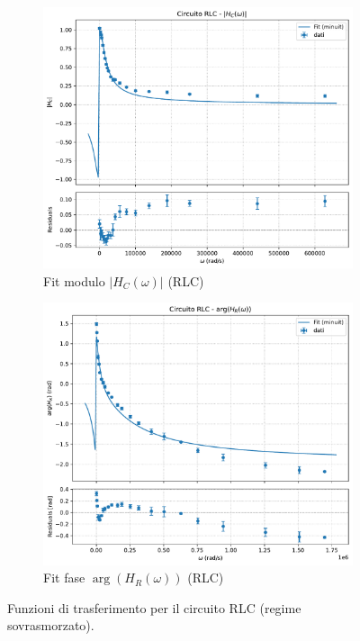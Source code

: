 \documentclass[a4paper]{article}
\begin{document}
\begin{figure}[htbp]
    \vspace{\baselineskip} %

    \begin{subfigure}[b]{0.495\textwidth}
        \centering
        \includegraphics[width=\linewidth]{grafici/rlc_hc.pdf}
        \caption{Fit modulo $|H_C(\omega)|$ (RLC)}
        \label{fig:rlc_hc}
    \end{subfigure}
    \hfill %
    \begin{subfigure}[b]{0.495\textwidth}
        \centering
        \includegraphics[width=\linewidth]{grafici/rlc_fase_hr.pdf}
        \caption{Fit fase $\arg(H_R(\omega))$ (RLC)}
        \label{fig:rlc_fase_hr}
    \end{subfigure}

    \caption{Funzioni di trasferimento per il circuito RLC (regime sovrasmorzato).}
    \label{fig:funzioni_trasferimento_rlc}
\end{figure}
\end{document}
